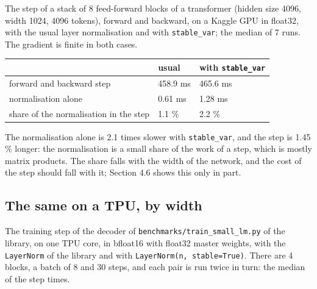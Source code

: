 \documentclass[11pt]{article}
\begin{document}
The step of a stack of 8 feed-forward blocks of a transformer (hidden size 4096, width 1024, 4096 tokens), forward and backward, on a Kaggle GPU in float32, with the usual layer normalisation and with \texttt{stable\_var}; the median of 7 runs. The gradient is finite in both cases.

\begin{table}[H]
\centering
\small
\begin{tabular}{lll}
\toprule
 & usual & with \texttt{stable\_var} \\
\midrule
forward and backward step & 458.9 ms & 465.6 ms \\
normalisation alone & 0.61 ms & 1.28 ms \\
share of the normalisation in the step & 1.1 \% & 2.2 \% \\
\bottomrule
\end{tabular}
\end{table}

The normalisation alone is 2.1 times slower with \texttt{stable\_var}, and the step is 1.45 \% longer: the normalisation is a small share of the work of a step, which is mostly matrix products. The share falls with the width of the network, and the cost of the step should fall with it; Section 4.6 shows this only in part.

\subsection{The same on a TPU, by width}

The training step of the decoder of \texttt{benchmarks/train\_small\_lm.py} of the library, on one TPU core, in bfloat16 with float32 master weights, with the \texttt{LayerNorm} of the library and with \texttt{LayerNorm(n, stable=True)}. There are 4 blocks, a batch of 8 and 30 steps, and each pair is run twice in turn: the median of the step times.

\begin{table}[H]
\centering
\small
{}
\end{table}
\end{document}
